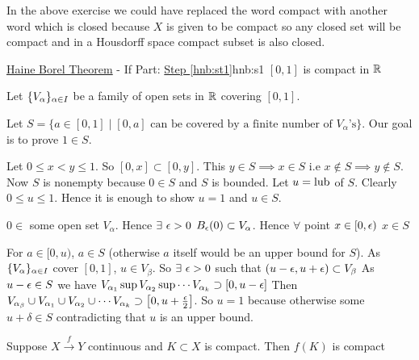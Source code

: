 In the above exercise we could have replaced the word compact with another word which is closed because $X$ is given to be compact so any closed set will be compact and in a Housdorff space compact subset is also closed.


\begin{Theorem}{\hyperref[th:hnb]{Haine Borel Theorem} - If Part: \hyperref[hnb:st1]{Step \ref{hnb:st1}}}{hnb:s1}
	$[0,1]$ is compact in $\mathbb{R}$
\end{Theorem}
\begin{myproof}
	Let $\{V_{\alpha}\}_{\alpha\in I}$ be a family of open sets in $\mathbb{R}$ covering $[0,1]$.

	Let $S=\{a\in [0,1]\mid [0,a]\text{ can be covered by a finite number of }V_{\alpha}\text{'s}\}$. Our goal is to prove $1\in S$.

	Let $0\leq x<y\leq 1$. So $[0,x]\subset [0,y]$. This $y\in S\implies x\in S$ i.e $x\notin S\implies y\notin S$. Now $S$ is nonempty because $0\in S$ and $S$ is bounded. Let $u=\text{lub}$ of $S$. Clearly $0\leq u\leq 1$. Hence it is enough to show $u=1$ and $u\in S$.

	$0\in$ some open set $V_{\alpha}$. Hence $\exists\ \epsilon>0$ $B_{\epsilon}(0)\subset V_{\alpha}$. Hence $\forall$ point $x\in [0,\epsilon)$ $x\in S$

	For $a\in[0,u)$, $a\in S$ (otherwise $a$ itself would be an upper bound for $S$). As $\{V_{\alpha}\}_{\alpha\in I}$ cover $[0,1]$, $u\in V_{\beta}$. So $\exists \ \epsilon>0$ such that $(u-\epsilon,u+\epsilon)\subset V_{\beta}$ As $u-\epsilon\in S$ we have $V_{\alpha_{1}}\sup V_{\alpha_{2}}\sup\cdots V_{\alpha_{k}}\supset [0,u-\epsilon]$ Then $V_{\alpha_{\beta}}\cup V_{\alpha_{1}}\cup V_{\alpha_{2}}\cup \cdots V_{\alpha_{k}}\supset \left[0,u+\frac{\epsilon}{2}\right]$. So $u=1$ because otherwise some $u+\delta\in S$ contradicting that $u$ is an upper bound.
\end{myproof}
\begin{Theorem}{}{}
	Suppose $X\xrightarrow{f} Y$ continuous and $K\subset X$ is compact. Then $f(K)$ is compact
\end{Theorem}
